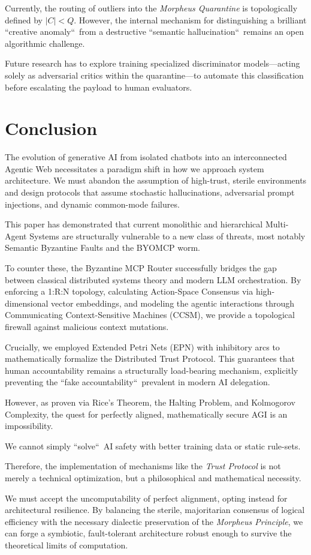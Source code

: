 \documentclass[a4paper,11pt,twocolumn]{article}
\theoremstyle{definition}
\theoremstyle{plain}
\begin{document}
Currently, the routing of outliers into the \textit{Morpheus Quarantine} is topologically defined by $|C| < Q$. However, the internal mechanism for distinguishing a brilliant “creative anomaly“\ from a destructive “semantic hallucination“\ remains an open algorithmic challenge.

Future research has to explore training specialized discriminator models---acting solely as adversarial critics within the quarantine---to automate this classification before escalating the payload to human evaluators.

\section{Conclusion}

The evolution of generative AI from isolated chatbots into an interconnected Agentic Web necessitates a paradigm shift in how we approach system architecture. We must abandon the assumption of high-trust, sterile environments and design protocols that assume stochastic hallucinations, adversarial prompt injections, and dynamic common-mode failures. 

This paper has demonstrated that current monolithic and hierarchical Multi-Agent Systems are structurally vulnerable to a new class of threats, most notably Semantic Byzantine Faults and the BYOMCP worm.

To counter these, the Byzantine MCP Router successfully bridges the gap between classical distributed systems theory and modern LLM orchestration. By enforcing a 1:R:N topology, calculating Action-Space Consensus via high-dimensional vector embeddings, and modeling the agentic interactions through Communicating Context-Sensitive Machines (CCSM), we provide a topological firewall against malicious context mutations.

\pagebreak

Crucially, we employed Extended Petri Nets (EPN) with inhibitory arcs to mathematically formalize the Distributed Trust Protocol.
This guarantees that human accountability remains a structurally load-bearing mechanism, explicitly preventing the “fake accountability“\ prevalent in modern AI delegation.

However, as proven via Rice's Theorem, the Halting Problem, and Kolmogorov Complexity, the quest for perfectly aligned, mathematically secure AGI is an impossibility.

We cannot simply “solve“\ AI safety with better training data or static rule-sets.


Therefore, the implementation of mechanisms like the \textit{Trust Protocol} is not merely a technical optimization, but a philosophical and mathematical necessity.

We must accept the uncomputability of perfect alignment, opting instead for architectural resilience. By balancing the sterile, majoritarian consensus of logical efficiency with the necessary dialectic preservation of the \textit{Morpheus Principle}, we can forge a symbiotic, fault-tolerant architecture robust enough to survive the theoretical limits of computation.

\printbibliography
\end{document}
